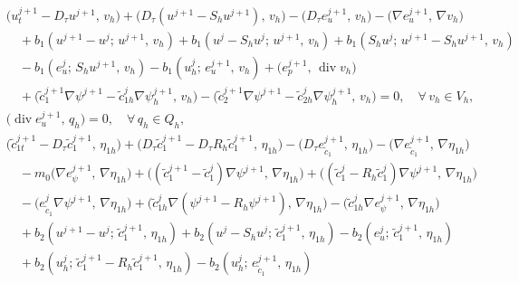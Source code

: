 \documentclass[a4paper,fleqn]{cas-sc}
\numberwithin{equation}{section}
\theoremstyle{definition}
\begin{document}
\begin{align}
  &\bigl(u_{t}^{j+1} - D_{\tau}u^{j+1},\, v_{h}\bigr)
   + \bigl(D_{\tau}(u^{j+1} - S_{h}u^{j+1}),\, v_{h}\bigr)
   - \bigl(D_{\tau}e_{u}^{j+1},\, v_{h}\bigr)
   - \bigl(\nabla e_{u}^{j+1},\, \nabla v_{h}\bigr) \nonumber\\
  &\quad + b_{1}(u^{j+1}-u^{j};\, u^{j+1},\, v_{h})
   + b_{1}(u^{j} - S_{h}u^{j};\, u^{j+1},\, v_{h})
   + b_{1}(S_{h}u^{j};\, u^{j+1} - S_{h}u^{j+1},\, v_{h}) \nonumber\\
  &\quad - b_{1}(e_{u}^{j};\, S_{h}u^{j+1},\, v_{h})
   - b_{1}(u_{h}^{j};\, e_{u}^{j+1},\, v_{h})
   + \bigl(e_{p}^{j+1},\, \operatorname{div} v_{h}\bigr) \nonumber\\
  &\quad + \bigl(\tilde{c}_{1}^{j+1}\nabla\psi^{j+1}
             - \tilde{c}_{1h}^{j}\nabla\psi_{h}^{j+1},\, v_{h}\bigr)
   - \bigl(\tilde{c}_{2}^{j+1}\nabla\psi^{j+1}
             - \tilde{c}_{2h}^{j}\nabla\psi_{h}^{j+1},\, v_{h}\bigr)
   = 0, \quad \forall\, v_{h}\in V_{h},
  \label{eq:4.2}\\[4pt]
  &\bigl(\operatorname{div} e_{u}^{j+1},\, q_{h}\bigr) = 0,
   \quad \forall\, q_{h}\in Q_{h},
  \label{eq:4.3}\\[4pt]
  &\bigl(\tilde{c}_{1t}^{j+1} - D_{\tau}\tilde{c}_{1}^{j+1},\, \eta_{1h}\bigr)
   + \bigl(D_{\tau}\tilde{c}_{1}^{j+1} - D_{\tau}R_{h}\tilde{c}_{1}^{j+1},\, \eta_{1h}\bigr)
   - \bigl(D_{\tau}e_{\tilde{c}_{1}}^{j+1},\, \eta_{1h}\bigr)
   - \bigl(\nabla e_{\tilde{c}_{1}}^{j+1},\, \nabla\eta_{1h}\bigr) \nonumber\\
  &\quad - m_{0}\bigl(\nabla e_{\psi}^{j+1},\, \nabla\eta_{1h}\bigr)
   + \bigl((\tilde{c}_{1}^{j+1} - \tilde{c}_{1}^{j})\nabla\psi^{j+1},\, \nabla\eta_{1h}\bigr)
   + \bigl((\tilde{c}_{1}^{j} - R_{h}\tilde{c}_{1}^{j})\nabla\psi^{j+1},\, \nabla\eta_{1h}\bigr) \nonumber\\
  &\quad - \bigl(e_{\tilde{c}_{1}}^{j}\nabla\psi^{j+1},\, \nabla\eta_{1h}\bigr)
   + \bigl(\tilde{c}_{1h}^{j}\nabla(\psi^{j+1} - R_{h}\psi^{j+1}),\, \nabla\eta_{1h}\bigr)
   - \bigl(\tilde{c}_{1h}^{j}\nabla e_{\psi}^{j+1},\, \nabla\eta_{1h}\bigr) \nonumber\\
  &\quad + b_{2}(u^{j+1}-u^{j};\, \tilde{c}_{1}^{j+1},\, \eta_{1h})
   + b_{2}(u^{j} - S_{h}u^{j};\, \tilde{c}_{1}^{j+1},\, \eta_{1h})
   - b_{2}(e_{u}^{j};\, \tilde{c}_{1}^{j+1},\, \eta_{1h}) \nonumber\\
  &\quad + b_{2}(u_{h}^{j};\, \tilde{c}_{1}^{j+1} - R_{h}\tilde{c}_{1}^{j+1},\, \eta_{1h})
   - b_{2}(u_{h}^{j};\, e_{\tilde{c}_{1}}^{j+1},\, \eta_{1h})

\end{align}
\end{document}

